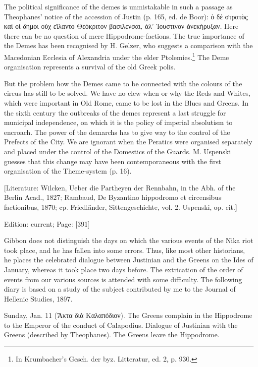 The political significance of the demes is unmistakable in such a passage as Theophanes\texthebrew{}’ notice of the accession of Justin (p. 165, ed. de Boor): \textgreek{\texthebrew{ὸ} δ\texthebrew{ὲ} στρατ\texthebrew{ὸ}ς κα\texthebrew{ὶ} ο\texthebrew{ἱ} δημοι ο\texthebrew{ὐ}χ ε\texthebrew{ἴ}λαντο Θεόκριτον βασιλενσαι, \texthebrew{ἀ}λ\texthebrew{’ Ἰ}ουστινον \texthebrew{ἀ}νεκήρυξαν}. Here there can be no question of mere Hippodrome-factions. The true importance of the Demes has been recognised by H. Gelzer, who suggests a comparison with the Macedonian Ecclesia of Alexandria under the elder Ptolemies.\footnote{In Krumbacher\texthebrew{}’s Gesch. der byz. Litteratur, ed. 2, p. 930.} The Deme organisation represents a survival of the old Greek polis.

But the problem how the Demes came to be connected with the colours of the circus has still to be solved. We have no clew when or why the Reds and Whites, which were important in Old Rome, came to be lost in the Blues and Greens. In the sixth century the outbreaks of the demes represent a last struggle for municipal independence, on which it is the policy of imperial absolutism to encroach. The power of the demarchs has to give way to the control of the Prefects of the City. We are ignorant when the Peratics were organised separately and placed under the control of the Domestics of the Guards. M. Uspenski guesses that this change may have been contemporaneous with the first organisation of the Theme-system (p. 16).

[Literature: Wilcken, Ueber die Partheyen der Rennbahn, in the Abh. of the Berlin Acad., 1827; Rambaud, De Byzantino hippodromo et circensibus factionibus, 1870; cp. Friedländer, Sittengeschichte, vol. 2. Uspenski, op. cit.]

Edition: current; Page: [391]


Gibbon does not distinguish the days on which the various events of the Nika riot took place, and he has fallen into some errors. Thus, like most other historians, he places the celebrated dialogue between Justinian and the Greens on the Ides of January, whereas it took place two days before. The extrication of the order of events from our various sources is attended with some difficulty. The following diary is based on a study of the subject contributed by me to the Journal of Hellenic Studies, 1897.

Sunday, Jan. 11 (\textgreek{\texthebrew{Ἅ}κτα δι\texthebrew{ὰ} Καλαπόδιον}). The Greens complain in the Hippodrome to the Emperor of the conduct of Calapodius. Dialogue of Justinian with the Greens (described by Theophanes). The Greens leave the Hippodrome.

